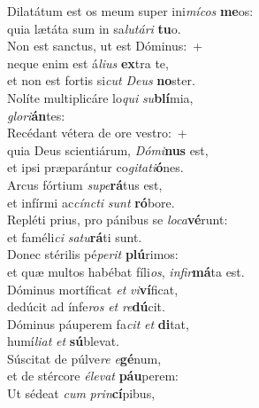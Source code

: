 \evenverse Dilatátum est os meum super ini\textit{mí}\textit{cos} \textbf{me}os:~\*\\
\evenverse quia lætáta sum in sa\textit{lu}\textit{tá}\textit{ri} \textbf{tu}o.\\
\oddverse Non est sanctus, ut est Dóminus:~+\\
\oddverse  neque enim est á\textit{li}\textit{us} \textbf{ex}tra te,~\*\\
\oddverse et non est fortis si\textit{cut} \textit{De}\textit{us} \textbf{no}ster.\\
\evenverse Nolíte multiplicáre lo\textit{qui} \textit{su}\textbf{blí}mia,~\*\\
\evenverse \textit{glo}\textit{ri}\textbf{án}tes:\\
\oddverse Recédant vétera de ore vestro:~+\\
\oddverse  quia Deus scientiárum, \textit{Dó}\textit{mi}\textbf{nus} est,~\*\\
\oddverse et ipsi præparántur co\textit{gi}\textit{ta}\textit{ti}\textbf{ó}nes.\\
\evenverse Arcus fórtium \textit{su}\textit{pe}\textbf{rá}tus est,~\*\\
\evenverse et infírmi ac\textit{cín}\textit{cti} \textit{sunt} \textbf{ró}bore.\\
\oddverse Repléti prius, pro pánibus se \textit{lo}\textit{ca}\textbf{vé}runt:~\*\\
\oddverse et faméli\textit{ci} \textit{sa}\textit{tu}\textbf{rá}ti sunt.\\
\evenverse Donec stérilis pé\textit{pe}\textit{rit} \textbf{plú}rimos:~\*\\
\evenverse et quæ multos habébat fíli\textit{os}, \textit{in}\textit{fir}\textbf{má}ta est.\\
\oddverse Dóminus mortíficat \textit{et} \textit{vi}\textbf{ví}ficat,~\*\\
\oddverse dedúcit ad ínfe\textit{ros} \textit{et} \textit{re}\textbf{dú}cit.\\
\evenverse Dóminus páuperem fa\textit{cit} \textit{et} \textbf{di}tat,~\*\\
\evenverse humí\textit{li}\textit{at} \textit{et} \textbf{sú}blevat.\\
\oddverse Súscitat de púlve\textit{re} \textit{e}\textbf{gé}num,~\*\\
\oddverse et de stércore \textit{é}\textit{le}\textit{vat} \textbf{páu}perem:\\
\evenverse Ut sédeat \textit{cum} \textit{prin}\textbf{cí}pibus,~\*\\
